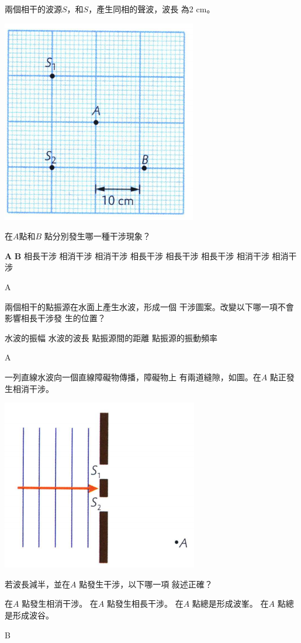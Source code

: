 {
    兩個相干的波源$S$，和$S$，產生同相的聲波，波長 為2 cm。
    \par{\par\centering\includegraphics[width=.3\textwidth]{./img/ch3_earlyclass_wave_mc_2024-05-14-10-28-28.png}\par}
    在$A$點和$B$ 點分別發生哪一種干涉現象？
    \begin{tasks}
        \task \textbf{A} \tab\tab \textbf{B}
        \task 相長干涉 \tab\tab 相消干涉
        \task 相消干涉 \tab\tab 相長干涉
        \task 相長干涉 \tab\tab 相長干涉
        \task 相消干涉 \tab\tab 相消干涉
    \end{tasks}


}{\mckey A}

{
    兩個相干的點振源在水面上產生水波，形成一個 干涉圖案。改變以下哪一項不會影響相長干涉發 生的位置？
    \begin{tasks}

        \task 水波的振幅
        \task 水波的波長
        \task 點振源間的距離
        \task 點振源的振動頻率
    \end{tasks}
}{\mckey A}

{
    一列直線水波向一個直線障礙物傳播，障礙物上 有兩道縫隙，如圖。在$A$ 點正發生相消干涉。
    \par{\par\centering\includegraphics[width=.3\textwidth]{./img/ch3_earlyclass_wave_mc_2024-05-14-11-08-33.png}\par}
    若波長減半，並在$A$ 點發生干涉，以下哪一項 敍述正確？
    \begin{tasks}
        \task 在$A$ 點發生相消干涉。
        \task 在$A$ 點發生相長干涉。
        \task 在$A$ 點總是形成波峯。
        \task 在$A$ 點總是形成波谷。
    \end{tasks}

}{\mckey B}


